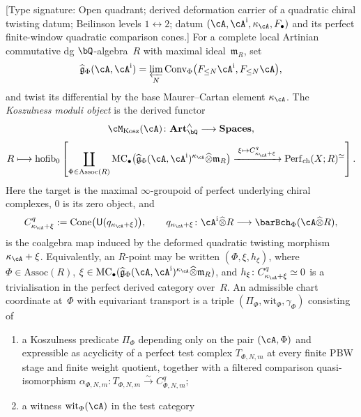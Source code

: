 \begin{definition}
\label{v1-def:kms-moduli-scheme}
\ClaimStatusDefinitional
\textup{[Type signature: Open quadrant; derived deformation carrier
of a quadratic chiral twisting datum; Beilinson levels
$1\leftrightarrow2$; datum
$(\cA,\cA^{\mathrm i},\kappa_\cA,F_\bullet)$ and its perfect
finite-window quadratic comparison cones.]}
For a complete local Artinian commutative dg
$\bQ$-algebra~$R$ with maximal ideal~$\mathfrak m_R$, set
\[
\widehat{\mathfrak g}_\Phi(\cA,\cA^{\mathrm i})
=
\varprojlim_N
\mathrm{Conv}_\Phi
\bigl(F_{\le N}\cA^{\mathrm i},F_{\le N}\cA\bigr),
\]
and twist its differential by the base Maurer--Cartan element
$\kappa_\cA$.  The \emph{Koszulness moduli object} is the derived
functor
\[
\cM_{\mathrm{Kosz}}(\cA)\colon
\mathbf{Art}^{\wedge}_{\bQ}
\longrightarrow \mathbf{Spaces},
\]
\[
R\longmapsto
\operatorname{hofib}_{0}
\left[
\coprod_{\Phi\in\mathrm{Assoc}(R)}
\mathrm{MC}_{\bullet}\bigl(
\widehat{\mathfrak g}_\Phi(\cA,\cA^{\mathrm i})^{\kappa_\cA}
\widehat{\otimes}\mathfrak m_R\bigr)
\xrightarrow{\;\xi\mapsto C^q_{\kappa_\cA+\xi}\;}
\operatorname{Perf}_{\mathrm{ch}}(X;R)^\simeq
\right].
\]
Here the target is the maximal $\infty$-groupoid of perfect
underlying chiral complexes, $0$ is its zero object, and
\[
 C^q_{\kappa_\cA+\xi}
 :=\operatorname{Cone}\bigl(\mathsf U(q_{\kappa_\cA+\xi})\bigr),
 \qquad
 q_{\kappa_\cA+\xi}\colon
 \cA^{\mathrm i}\widehat\otimes R
 \longrightarrow
 \barBch_\Phi(\cA\widehat\otimes R),
\]
is the coalgebra map induced by the deformed quadratic twisting
morphism $\kappa_\cA+\xi$.
Equivalently, an $R$-point may be written
$(\Phi,\xi,h_\xi)$, where
$\Phi\in\mathrm{Assoc}(R)$,
$\xi\in
\mathrm{MC}_{\bullet}(
\widehat{\mathfrak g}_\Phi(\cA,\cA^{\mathrm i})^{\kappa_\cA}
\widehat{\otimes}\mathfrak m_R)$, and
$h_\xi\colon C^q_{\kappa_\cA+\xi}\simeq0$ is a
trivialisation in the perfect derived category over~$R$.
An admissible chart coordinate at~$\Phi$ with equivariant transport
is a triple
$(\Pi_\Phi,\mathrm{wit}_\Phi,\gamma_\Phi)$ consisting of
\begin{enumerate}[label=\textup{(\alph*)}]
\item a Koszulness predicate $\Pi_\Phi$ depending only on the
 pair $(\cA,\Phi)$ and expressible as acyclicity of a perfect
 test complex $T_{\Phi,N,m}$ at every finite PBW stage and
 finite weight quotient, together
 with a filtered comparison quasi-isomorphism
 $\alpha_{\Phi,N,m}\colon T_{\Phi,N,m}\xrightarrow{\sim}
 C^q_{\Phi,N,m}$;
\item a witness $\mathrm{wit}_\Phi(\cA)$ in the test category

\end{enumerate}
\end{definition}
